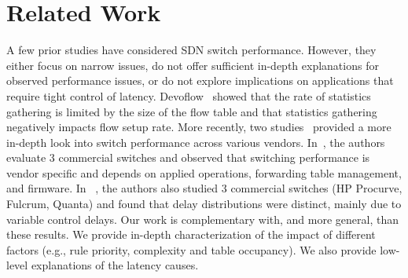 \section{Related Work}
\label{sec:related}

A few prior studies have considered SDN switch performance. However, 
they either focus on narrow issues, do not offer
sufficient in-depth explanations for observed performance issues, or do
not explore implications on applications that require tight
control of latency.  Devoflow~\cite{devoflow} showed that the rate of statistics
gathering is limited by the size of the flow table and that statistics
gathering negatively impacts flow setup rate.  More recently, two
studies~\cite{oflops,ucsdpaper} provided a more in-depth look into
switch performance across various vendors.  In~\cite{oflops}, the
authors evaluate 3 commercial switches and observed that switching
performance is vendor specific and depends on applied operations,
forwarding table management, and firmware. In ~\cite{ucsdpaper}, the
authors also studied 3 commercial switches (HP Procurve, Fulcrum,
Quanta) and found that delay distributions were distinct, mainly due
to variable control delays.  Our work is complementary with, and more
general, than these results. We provide in-depth characterization of the impact of
different factors (e.g., rule priority, complexity and table occupancy). We also provide
low-level explanations of the latency causes.



